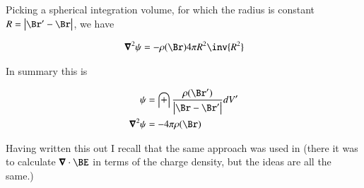 \documentclass{article}
\begin{document}
Picking a spherical integration volume, for which the radius is constant $R = \Abs{\Br'-\Br}$, we have

\begin{align*}
\spacegrad^2 \psi 
&= -\rho(\Br) 4 \pi R^2 \inv{R^2} \\
\end{align*}

In summary this is

\begin{align}\label{eqn:laplacianOfPoisson}
\psi &= \int \frac{\rho(\Br')}{\Abs{\Br - \Br'}} dV' \\
\spacegrad^2 \psi &= - 4 \pi \rho(\Br)
\end{align}

Having written this out I recall that the same approach was used in
\cite{schwartz1987pe} (there it was to calculate $\spacegrad \cdot \BE$ in terms of the charge density, but the ideas are all the same.)



\end{document}
